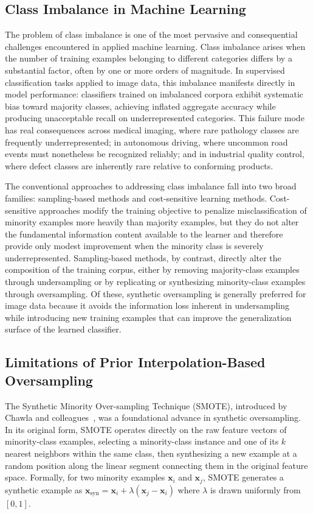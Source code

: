 \documentclass[12pt,letterpaper]{article}
\newcommand{\bx}{\mathbf{x}}
\begin{document}
\subsection{Class Imbalance in Machine Learning}

The problem of class imbalance is one of the most pervasive and consequential
challenges encountered in applied machine learning.  Class imbalance arises
when the number of training examples belonging to different categories differs
by a substantial factor, often by one or more orders of magnitude.  In
supervised classification tasks applied to image data, this imbalance
manifests directly in model performance: classifiers trained on imbalanced
corpora exhibit systematic bias toward majority classes, achieving inflated
aggregate accuracy while producing unacceptable recall on underrepresented
categories.  This failure mode has real consequences across medical imaging,
where rare pathology classes are frequently underrepresented; in autonomous
driving, where uncommon road events must nonetheless be recognized reliably;
and in industrial quality control, where defect classes are inherently rare
relative to conforming products.

The conventional approaches to addressing class imbalance fall into two broad
families: sampling-based methods and cost-sensitive learning methods.
Cost-sensitive approaches modify the training objective to penalize
misclassification of minority examples more heavily than majority examples,
but they do not alter the fundamental information content available to the
learner and therefore provide only modest improvement when the minority class
is severely underrepresented.  Sampling-based methods, by contrast, directly
alter the composition of the training corpus, either by removing
majority-class examples through undersampling or by replicating or
synthesizing minority-class examples through oversampling.  Of these,
synthetic oversampling is generally preferred for image data because it avoids
the information loss inherent in undersampling while introducing new training
examples that can improve the generalization surface of the learned classifier.

\subsection{Limitations of Prior Interpolation-Based Oversampling}

The Synthetic Minority Over-sampling Technique (SMOTE), introduced by Chawla
and colleagues~\cite{chawla2002}, was a foundational advance in synthetic
oversampling.  In its original form, SMOTE operates directly on the raw
feature vectors of minority-class examples, selecting a minority-class
instance and one of its $k$ nearest neighbors within the same class, then
synthesizing a new example at a random position along the linear segment
connecting them in the original feature space.  Formally, for two minority
examples $\bx_i$ and $\bx_j$, SMOTE generates a synthetic example as
$\bx_{\text{syn}} = \bx_i + \lambda(\bx_j - \bx_i)$ where $\lambda$ is
drawn uniformly from $[0,1]$.
\end{document}
